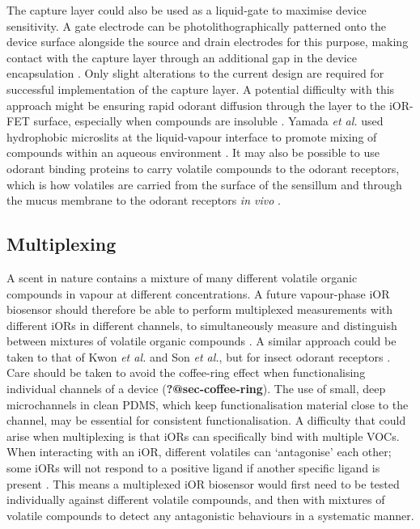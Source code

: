 \documentclass[
  a4paper,
]{scrbook}
\begin{document}
The capture layer could also be used as a liquid-gate to maximise device
sensitivity. A gate electrode can be photolithographically patterned
onto the device surface alongside the source and drain electrodes for
this purpose, making contact with the capture layer through an
additional gap in the device encapsulation \autocite{Shkodra2021}. Only
slight alterations to the current design are required for successful
implementation of the capture layer. A potential difficulty with this
approach might be ensuring rapid odorant diffusion through the layer to
the iOR-FET surface, especially when compounds are insoluble
\autocite{Yamada2021,Hurot2020,Warden2019,Cali2020,Lee2015,Spencer2021}.
Yamada \emph{et al.} used hydrophobic microslits at the liquid-vapour
interface to promote mixing of compounds within an aqueous environment
\autocite{Yamada2021}. It may also be possible to use odorant binding
proteins to carry volatile compounds to the odorant receptors, which is
how volatiles are carried from the surface of the sensillum and through
the mucus membrane to the odorant receptors \emph{in vivo}
\autocite{Larisika2015,Kotlowski2018,Brito2016,Cali2020,Pelosi2018,Sankaran2011}.

\hypertarget{multiplexing}{%
\subsection{Multiplexing}\label{multiplexing}}

A scent in nature contains a mixture of many different volatile organic
compounds in vapour at different concentrations. A future vapour-phase
iOR biosensor should therefore be able to perform multiplexed
measurements with different iORs in different channels, to
simultaneously measure and distinguish between mixtures of volatile
organic compounds \autocite{Kwon2015,Hurot2020,Hirata2021}. A similar
approach could be taken to that of Kwon \emph{et al.} and Son \emph{et
al.}, but for insect odorant receptors \autocite{Kwon2015,Son2017}. Care
should be taken to avoid the coffee-ring effect when functionalising
individual channels of a device (\textbf{?@sec-coffee-ring}). The use of
small, deep microchannels in clean PDMS, which keep functionalisation
material close to the channel, may be essential for consistent
functionalisation. A difficulty that could arise when multiplexing is
that iORs can specifically bind with multiple VOCs. When interacting
with an iOR, different volatiles can `antagonise' each other; some iORs
will not respond to a positive ligand if another specific ligand is
present \autocite{Kwon2015,Son2017,Munch2016,Hirata2021}. This means a
multiplexed iOR biosensor would first need to be tested individually
against different volatile compounds, and then with mixtures of volatile
compounds to detect any antagonistic behaviours in a systematic manner.
\end{document}
